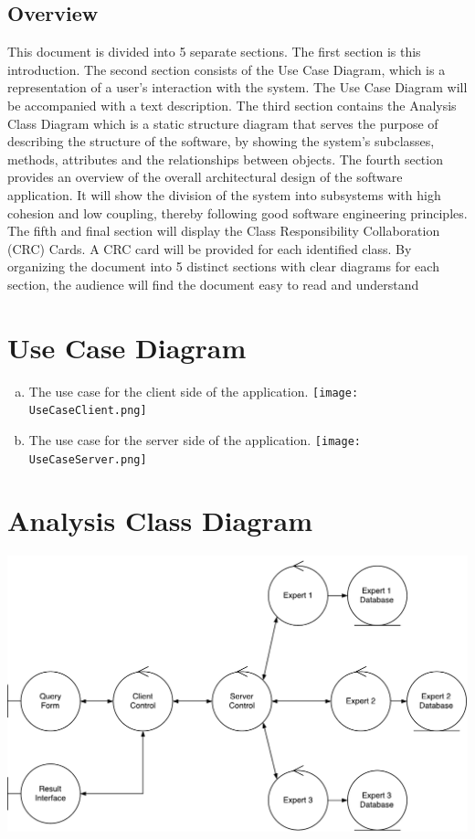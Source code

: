 \documentclass[]{article}
\begin{document}
\subsection{Overview}
\label{sub:overview}
This document is divided into 5 separate sections. The first section is this introduction. The second section consists of the Use Case Diagram, which is a representation of a user’s interaction with the system. The Use Case Diagram will be accompanied with a text description. The third section contains the Analysis Class Diagram which is a static structure diagram that serves the purpose of describing the structure of the software, by showing the system’s subclasses, methods, attributes and the relationships between objects. The fourth section provides an overview of the overall architectural design of the software application. It will show the division of the system into subsystems with high cohesion and low coupling, thereby following good software engineering principles. 
The fifth and final section will display the Class Responsibility Collaboration (CRC) Cards. A CRC card will be provided for each identified class. By organizing the document into 5 distinct sections with clear diagrams for each section, the audience will find the document easy to read and understand


\section{Use Case Diagram}
\label{sec:use_case_diagram}
\begin{enumerate}[a)]
	\item The use case for the client side of the application.\newline
	\texttt{[image: UseCaseClient.png]}
	\newpage
	\item The use case for the server side of the application.\newline
	\texttt{[image: UseCaseServer.png]}
\end{enumerate}

\section{Analysis Class Diagram}
\label{sec:analysis_class_diagram}
\includegraphics[width=\textwidth]{ACDRevised}
\end{document}
